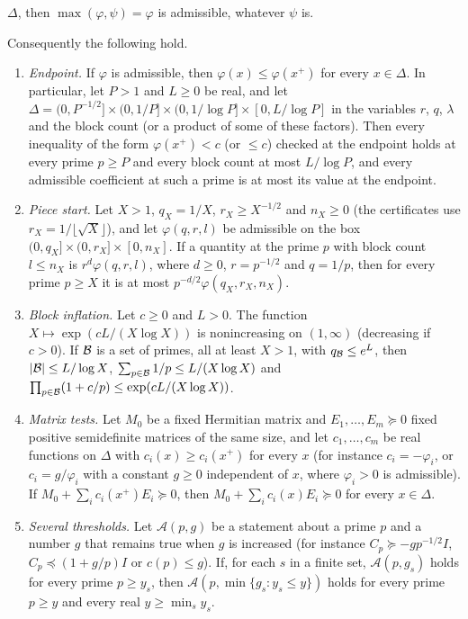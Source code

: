 \begin{lemma}
\begin{enumerate}[label=\textup{(\roman*)}]
 $\Delta$, then $\max(\varphi,\psi)=\varphi$ is admissible, whatever $\psi$ is.
\end{enumerate}
Consequently the following hold.
\begin{enumerate}[label=\textup{(\alph*)}]
\item \emph{Endpoint.} If $\varphi$ is admissible, then $\varphi(x)\le\varphi(x^+)$
 for every $x\in\Delta$. In particular, let $P>1$ and $L\ge0$ be real, and let
 $\Delta=(0,P^{-1/2}]\times(0,1/P]\times(0,1/\log P]\times[0,L/\log P]$ in the
 variables $r$, $q$, $\lambda$ and the block count (or a product of some of
 these factors). Then every inequality of the form $\varphi(x^+)<c$ (or $\le c$) checked at the
 endpoint holds at every prime $p\ge P$ and every block count at most
 $L/\log P$, and every admissible coefficient at such a prime is at most its
 value at the endpoint.
\item \emph{Piece start.} Let $X>1$, $q_X=1/X$, $r_X\ge X^{-1/2}$ and
 $n_X\ge0$ (the certificates use $r_X=1/\lfloor\sqrt X\rfloor$), and let
 $\varphi(q,r,l)$ be admissible on the box $(0,q_X]\times(0,r_X]\times[0,n_X]$.
 If a quantity at the prime $p$ with block count $l\le n_X$ is
 $r^d\varphi(q,r,l)$, where $d\ge0$, $r=p^{-1/2}$ and $q=1/p$, then for every
 prime $p\ge X$ it is at most $p^{-d/2}\varphi(q_X,r_X,n_X)$.
\item \emph{Block inflation.} Let $c\ge0$ and $L>0$. The function
 $X\mapsto\exp(cL/(X\log X))$ is nonincreasing on $(1,\infty)$ (decreasing if
 $c>0$). If $\mathcal B$ is a set of
 primes, all at least $X>1$, with $q_\mathcal B\le e^L$, then $|\mathcal B|\le L/\log X$,
 $\sum_{p\in\mathcal B}1/p\le L/(X\log X)$ and
 $\prod_{p\in\mathcal B}(1+c/p)\le\exp(cL/(X\log X))$.
\item \emph{Matrix tests.} Let $M_0$ be a fixed Hermitian matrix and
 $E_1,\dots,E_m\succeq0$ fixed positive semidefinite matrices of the same
 size, and let $c_1,\dots,c_m$ be real functions on $\Delta$
 with $c_i(x)\ge c_i(x^+)$ for every $x$ (for instance $c_i=-\varphi_i$, or
 $c_i=g/\varphi_i$ with a constant $g\ge0$ independent of $x$, where $\varphi_i>0$ is admissible). If
 $M_0+\sum_ic_i(x^+)E_i\succeq0$, then $M_0+\sum_ic_i(x)E_i\succeq0$ for every
 $x\in\Delta$.
\item \emph{Several thresholds.} Let $\mathcal A(p,g)$ be a statement about a
 prime $p$ and a number $g$ that remains true when $g$ is increased (for
 instance $C_p\succeq-gp^{-1/2}I$, $C_p\preceq(1+g/p)I$ or $c(p)\le g$). If,
 for each $s$ in a finite set, $\mathcal A(p,g_s)$ holds for every prime
 $p\ge y_s$, then $\mathcal A(p,\min\{g_s:y_s\le y\})$ holds for every prime
 $p\ge y$ and every real $y\ge\min_sy_s$.
\end{enumerate}
\end{lemma}

